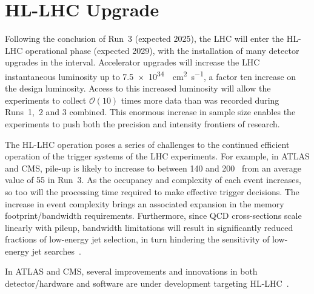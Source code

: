 \section{HL-LHC Upgrade}



Following the conclusion of Run~3 (expected 2025), the LHC will enter the HL-LHC operational phase (expected 2029), with the installation of many detector upgrades in the interval. Accelerator upgrades will increase the LHC instantaneous luminosity up to \SI{7.5e34}{\per\square\cm\per\second}, a factor ten increase on the design luminosity. Access to this increased luminosity will allow the experiments to collect $\mathcal{O}\left(10\right)$ times more data than was recorded during Runs~1,~2 and 3 combined. This enormous increase in sample size enables the experiments to push both the precision and intensity frontiers of research.

The HL-LHC operation poses a series of challenges to the continued efficient operation of the trigger systems of the LHC experiments. For example, in ATLAS and CMS, pile-up is likely to increase to between 140 and 200~\cite{ATLAS:pileup} from an average value of 55 in Run~3. As the occupancy and complexity of each event increases, so too will the processing time required to make effective trigger decisions. %
The increase in event complexity brings an associated expansion in the memory footprint/bandwidth requirements. 
Furthermore, since QCD cross-sections scale linearly with pileup, bandwidth limitations will result in significantly reduced fractions of low-energy jet selection, in turn hindering the sensitivity of low-energy jet searches~\cite{albrecht2018hep}.

In ATLAS and CMS, several improvements and innovations in both detector/hardware and software are under development targeting HL-LHC~\cite{hl-lhc}.

